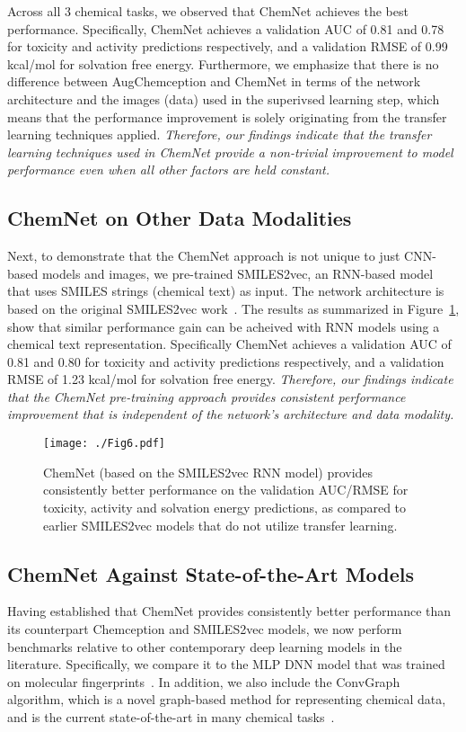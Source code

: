 \documentclass[sigconf]{acmart}
\begin{document}
Across all 3 chemical tasks, we observed that ChemNet achieves the best performance. Specifically, ChemNet achieves a validation AUC of 0.81 and 0.78 for toxicity and activity predictions respectively, and a validation RMSE of 0.99 kcal/mol for solvation free energy. Furthermore, we emphasize that there is no difference between AugChemception and ChemNet in terms of the network architecture and the images (data) used in the superivsed learning step, which means that the performance improvement is solely originating from the transfer learning techniques applied. \textit{Therefore, our findings indicate that the transfer learning techniques used in ChemNet provide a non-trivial improvement to model performance even when all other factors are held constant.}

\subsection{ChemNet on Other Data Modalities}

Next, to demonstrate that the ChemNet approach is not unique to just CNN-based models and images, we pre-trained SMILES2vec, an RNN-based model that uses SMILES strings (chemical text) as input. The network architecture is based on the original SMILES2vec work~\cite{goh2017s}. The results as summarized in Figure~\ref{fig:6}, show that similar performance gain can be acheived with RNN models using a chemical text representation. Specifically ChemNet achieves a validation AUC of 0.81 and 0.80 for toxicity and activity predictions respectively, and a validation RMSE of 1.23 kcal/mol for solvation free energy. \textit{Therefore, our findings indicate that the ChemNet pre-training approach provides consistent performance improvement that is independent of the network's architecture and data modality.}

\begin{figure}[!htbp]
\centering
\texttt{[image: ./Fig6.pdf]}
\caption{\small ChemNet (based on the SMILES2vec RNN model) provides consistently better performance on the validation AUC/RMSE for toxicity, activity and solvation energy predictions, as compared to earlier SMILES2vec models that do not utilize transfer learning.}
\label{fig:6}
\end{figure}

\subsection{ChemNet Against State-of-the-Art Models}
Having established that ChemNet provides consistently better performance than its counterpart Chemception and SMILES2vec models, we now perform benchmarks relative to other contemporary deep learning models in the literature. Specifically, we compare it to the MLP DNN model that was trained on molecular fingerprints~\cite{wu2017}. In addition, we also include the ConvGraph algorithm, which is a novel graph-based method for representing chemical data, and is the current state-of-the-art in many chemical tasks~\cite{wu2017}.
\end{document}
